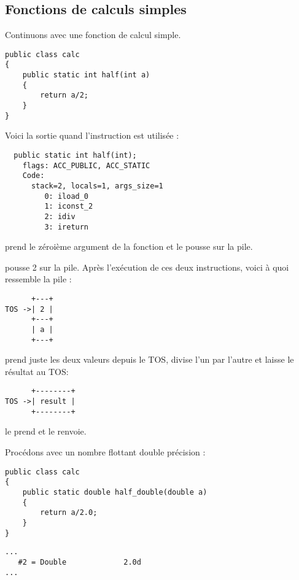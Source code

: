 \subsection{Fonctions de calculs simples}

Continuons avec une fonction de calcul simple.

\begin{lstlisting}[style=customjava]
public class calc
{
	public static int half(int a)
	{
		return a/2;
	}
}
\end{lstlisting}

Voici la sortie quand l'instruction  est utilisée :


\begin{lstlisting}
  public static int half(int);
    flags: ACC_PUBLIC, ACC_STATIC
    Code:
      stack=2, locals=1, args_size=1
         0: iload_0       
         1: iconst_2      
         2: idiv          
         3: ireturn       
\end{lstlisting}
         
 prend le zéroième argument de la fonction et le pousse sur la pile.

 pousse 2 sur la pile.
Après l'exécution de ces deux instructions, voici à quoi ressemble la pile :


\begin{lstlisting}
      +---+
TOS ->| 2 |
      +---+
      | a |
      +---+
\end{lstlisting}

 prend juste les deux valeurs depuis le \ac{TOS}, divise l'un par l'autre et laisse 
le résultat au \ac{TOS}:


\begin{lstlisting}
      +--------+
TOS ->| result |
      +--------+
\end{lstlisting}

 le prend et le renvoie.

Procédons avec un nombre flottant double précision :


\begin{lstlisting}[style=customjava]
public class calc
{
	public static double half_double(double a)
	{
		return a/2.0;
	}
}
\end{lstlisting}

\begin{lstlisting}[caption=Constant pool]
...
   #2 = Double             2.0d
...
\end{lstlisting}

